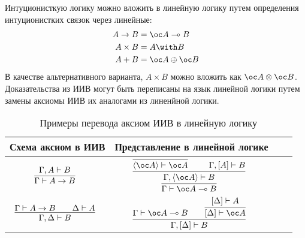 Интуционисткую логику можно вложить в линейную логику путем определения интуционистких связок через линейные:
\begin{align*}
    A \rightarrow B &= \oc A \multimap B \\
    A \times B      &= A \with B \\
    A + B           &= \oc A \oplus \oc B
\end{align*}
В качестве альтернативного варианта, $A \times B$ можно вложить как $\oc A \otimes \oc B$.
Доказательства из ИИВ могут быть переписаны на язык линейной логики путем замены аксиомы ИИВ их аналогами из линенйной логики.
\begin{table}
\centering
\begin{tabular}{Sc Sc} \toprule
	Схема аксиом в ИИВ & Представление в линейной логике \\ \toprule
	$\infer[]{\Gamma \vdash A \rightarrow B}{\Gamma, A \vdash B}$ &
	$\infer[]{\Gamma \vdash \oc A \multimap B}{
		\infer[]{\Gamma, \pair{\oc A} \vdash B}{
			\infer[]{\pair{\oc A} \vdash \oc A}{} && \Gamma, [A] \vdash B
		}
	}$ \\ \midrule
	$\infer[]{\Gamma, \Delta \vdash B}{\Gamma \vdash A \rightarrow B && \Delta \vdash A}$ &
	$\infer[]{\Gamma, [\Delta] \vdash B}{
		\Gamma \vdash \oc A \multimap B && \infer[]{[\Delta] \vdash \oc A}{[\Delta] \vdash A}
	}$ \\ \bottomrule
\end{tabular}
\caption{Примеры перевода аксиом ИИВ в линейную логику}
\label{intutionistic-axioms-to-linear-samples}
\end{table}
